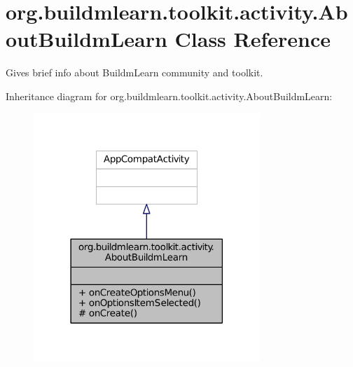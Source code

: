 \hypertarget{classorg_1_1buildmlearn_1_1toolkit_1_1activity_1_1AboutBuildmLearn}{\section{org.\-buildmlearn.\-toolkit.\-activity.\-About\-Buildm\-Learn Class Reference}
\label{classorg_1_1buildmlearn_1_1toolkit_1_1activity_1_1AboutBuildmLearn}
}


Gives brief info about Buildm\-Learn community and toolkit.  




Inheritance diagram for org.\-buildmlearn.\-toolkit.\-activity.\-About\-Buildm\-Learn\-:
\nopagebreak
\begin{figure}[H]
\begin{center}
\leavevmode
\includegraphics[width=242pt]{d1/dc1/classorg_1_1buildmlearn_1_1toolkit_1_1activity_1_1AboutBuildmLearn__inherit__graph}
\end{center}
\end{figure}


